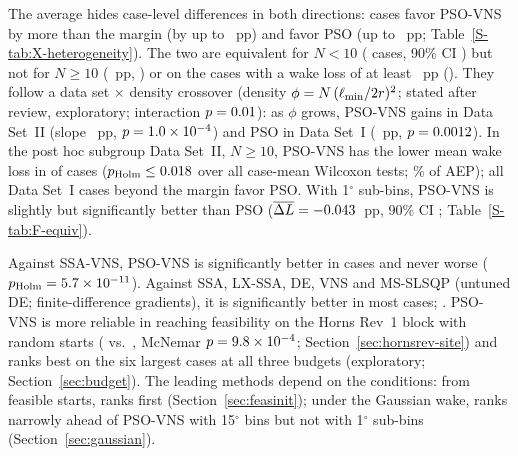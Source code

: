 The average hides case-level differences in both directions: \NXHetBeyondPSOVNS{} cases favor PSO-VNS by more than the margin (by up to \NXHetMaxPSOVNS~pp) and \NXHetBeyondPSO{} favor PSO (up to \NXHetMaxPSO~pp; Table~\ref{S-tab:X-heterogeneity}). The two are equivalent for $N<10$ (\NXEqSmallN{} cases, 90\% CI \NXEqSmallCI) but not for $N\ge10$ (\NXEqLargeMean~pp, \NXEqLargeCI) or on the \NXEqNontrivialN{} cases with a wake loss of at least \NXTrivialLoss~pp (\NXEqNontrivialCI). They follow a data set $\times$ density crossover (density $\phi=N\,(\ell_{\min}/2r)^2$; stated after review, exploratory; interaction $p=0.01$): as $\phi$ grows, PSO-VNS gains in Data Set~II (slope \NXDensSlopeDsII~pp, $p=1.0\times10^{-4}$) and PSO in Data Set~I (\NXDensSlopeDsI~pp, $p=0.0012$). In the post hoc subgroup Data Set~II, $N\ge10$, PSO-VNS has the lower mean wake loss in \NCmPSOVNSvsPSOdsIILargeWins{} of \NCmPSOVNSvsPSOdsIILargeN{} cases ($p_{\rm Holm}\le0.018$ over all \NXMultN{} case-mean Wilcoxon tests; \NXEnPSOVNSvsPSOdsIILargePct\% of AEP); all \NXHetDsINPSO{} Data Set~I cases beyond the margin favor PSO. With 1$^\circ$ sub-bins, PSO-VNS is slightly but significantly better than PSO ($\overline{\Delta L}=-0.043$~pp, 90\% CI \NFPairCIOne; Table~\ref{S-tab:F-equiv}).

Against SSA-VNS, PSO-VNS is significantly better in \NWtlSSAVNSW{} cases and never worse ($p_{\rm Holm}=5.7\times10^{-11}$). Against SSA, LX-SSA, DE, VNS and MS-SLSQP (untuned DE; finite-difference gradients), it is significantly better in most cases; \NLossesPhrase. PSO-VNS is more reliable in reaching feasibility on the Horns Rev~1 block with random starts (\NHRFeasPSOVNS{} vs.\ \NHRFeasPSO{}, McNemar $p=9.8\times10^{-4}$; Section~\ref{sec:hornsrev-site}) and ranks best on the six largest cases at all three budgets (exploratory; Section~\ref{sec:budget}). The leading methods depend on the conditions: from feasible starts, \NFbFeasBestRank{} ranks first (Section~\ref{sec:feasinit}); under the Gaussian wake, \NBestGauss{} ranks narrowly ahead of PSO-VNS with 15$^\circ$ bins but not with 1$^\circ$ sub-bins (Section~\ref{sec:gaussian}).

